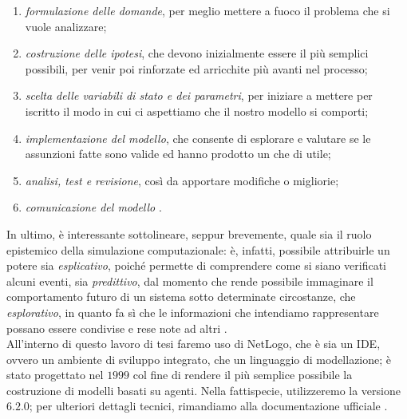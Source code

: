 \begin{enumerate}
\item \textit{formulazione delle domande}, per meglio mettere a fuoco il problema che si vuole analizzare;
\item \textit{costruzione delle ipotesi}, che devono inizialmente essere il più semplici possibili, per venir poi rinforzate ed arricchite più avanti nel processo;
\item \textit{scelta delle variabili di stato e dei parametri}, per iniziare a mettere per iscritto il modo in cui ci aspettiamo che il nostro modello si comporti;
\item \textit{implementazione del modello}, che consente di esplorare e valutare se le assunzioni fatte sono valide ed hanno prodotto un che di utile;
\item \textit{analisi, test e revisione}, così da apportare modifiche o migliorie;
\item \textit{comunicazione del modello} \cite{Grimm}.
\end{enumerate}
In ultimo, è interessante sottolineare, seppur brevemente, quale sia il ruolo epistemico della simulazione computazionale: è, infatti, possibile attribuirle un potere sia \emph{esplicativo}, poiché permette di comprendere come si siano verificati alcuni eventi, sia \emph{predittivo}, dal momento che rende possibile immaginare il comportamento futuro di un sistema sotto determinate circostanze, che \emph{esplorativo}, in quanto fa sì che le informazioni che intendiamo rappresentare possano essere condivise e rese note ad altri \cite{Primiero}.
\\ All'interno di questo lavoro di tesi faremo uso di NetLogo, che è sia un IDE, ovvero un ambiente di sviluppo integrato, che un linguaggio di modellazione; è stato progettato nel $ 1999 $ col fine di rendere il più semplice possibile la costruzione di modelli basati su agenti. Nella fattispecie, utilizzeremo la versione $ 6.2.0 $; per ulteriori dettagli tecnici, rimandiamo alla documentazione ufficiale \cite{Wilensky}.